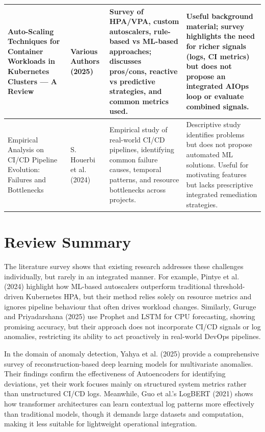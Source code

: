 \documentclass[12pt]{report}
\begin{document}
\begin{longtable}{|p{4.2cm}|p{3.2cm}|p{4.3cm}|p{3.8cm}|}
Auto-Scaling Techniques for Container Workloads in Kubernetes Clusters — A Review &
Various Authors (2025) &
Survey of HPA/VPA, custom autoscalers, rule-based vs ML-based approaches; discusses pros/cons, reactive vs predictive strategies, and common metrics used. &
Useful background material; survey highlights the need for richer signals (logs, CI metrics) but does not propose an integrated AIOps loop or evaluate combined signals. \\
\hline

Empirical Analysis on CI/CD Pipeline Evolution: Failures and Bottlenecks &
S. Houerbi et al. (2024) &
Empirical study of real-world CI/CD pipelines, identifying common failure causes, temporal patterns, and resource bottlenecks across projects. &
Descriptive study identifies problems but does not propose automated ML solutions. Useful for motivating features but lacks prescriptive integrated remediation strategies. \\
\hline


\end{longtable}


\section{Review Summary}

The literature survey shows that existing research addresses these challenges individually, but rarely in an integrated manner. For example, Pintye et al. (2024) highlight how ML-based autoscalers outperform traditional threshold-driven Kubernetes HPA, but their method relies solely on resource metrics and ignores pipeline behaviour that often drives workload changes. Similarly, Guruge and Priyadarshana (2025) use Prophet and LSTM for CPU forecasting, showing promising accuracy, but their approach does not incorporate CI/CD signals or log anomalies, restricting its ability to act proactively in real-world DevOps pipelines.

In the domain of anomaly detection, Yahya et al. (2025) provide a comprehensive survey of reconstruction-based deep learning models for multivariate anomalies. Their findings confirm the effectiveness of Autoencoders for identifying deviations, yet their work focuses mainly on structured system metrics rather than unstructured CI/CD logs. Meanwhile, Guo et al.’s LogBERT (2021) shows how transformer architectures can learn contextual log patterns more effectively than traditional models, though it demands large datasets and computation, making it less suitable for lightweight operational integration.
\end{document}
